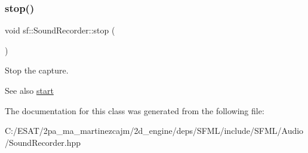 \subsubsection{\texorpdfstring{stop()}{stop()}}
{\footnotesize\ttfamily void sf\+::\+Sound\+Recorder\+::stop (\begin{DoxyParamCaption}{ }\end{DoxyParamCaption})}



Stop the capture. 

\begin{DoxySeeAlso}{See also}
\hyperlink{classsf_1_1_sound_recorder_a715f0fd2f228c83d79aaedca562ae51f}{start} 
\end{DoxySeeAlso}


The documentation for this class was generated from the following file\+:\begin{DoxyCompactItemize}
\item 
C\+:/\+E\+S\+A\+T/2pa\+\_\+ma\+\_\+martinezcajm/2d\+\_\+engine/deps/\+S\+F\+M\+L/include/\+S\+F\+M\+L/\+Audio/Sound\+Recorder.\+hpp\end{DoxyCompactItemize}
